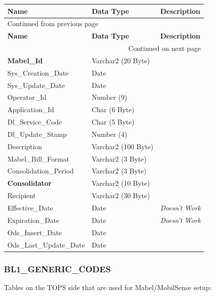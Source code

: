 \documentclass[12pt,twoside]{article}
\begin{document}
\begin{longtable}{l|l|l}
\hline
\textbf{Name} & \textbf{Data Type} & \textbf{Description}\\
\hline
\endfirsthead
\multicolumn{3}{l}{Continued from previous page} \\
\hline

\textbf{Name} & \textbf{Data Type} & \textbf{Description} \\

\hline
\endhead
\hline\multicolumn{3}{r}{Continued on next page} \\
\endfoot
\endlastfoot
\hline
\textbf{Mabel\_Id} & Varchar2 (20 Byte) & \\
Sys\_Creation\_Date & Date & \\
Sys\_Update\_Date & Date & \\
Operator\_Id & Number (9) & \\
Application\_Id & Char (6 Byte) & \\
Dl\_Service\_Code & Char (5 Byte) & \\
Dl\_Update\_Stamp & Number (4) & \\
Description & Varchar2 (100 Byte) & \\
Mabel\_Bill\_Format & Varchar2 (3 Byte) & \\
Consolidation\_Period & Varchar2 (3 Byte) & \\
\textbf{Consolidator} & Varchar2 (10 Byte) & \\
Recipient & Varchar2 (30 Byte) & \\
Effective\_Date & Date & \emph{Doesn't Work}\\
Expiration\_Date & Date & \emph{Doesn't Work}\\
Ods\_Insert\_Date & Date & \\
Ods\_Last\_Update\_Date & Date & \\
\hline
\end{longtable}
\normalsize
\subsubsection{BL1\_GENERIC\_CODES}
\label{sec:orgheadline148}
Tables on the TOPS side that are used for Mabel/MobilSense setup:
\footnotesize
\end{document}
